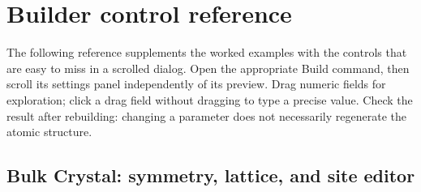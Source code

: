 \section{Builder control reference}\label{sec:builder-controls}
The following reference supplements the worked examples with the controls that are easy to miss in a scrolled dialog. Open the appropriate Build command, then scroll its settings panel independently of its preview. Drag numeric fields for exploration; click a drag field without dragging to type a precise value. Check the result after rebuilding: changing a parameter does not necessarily regenerate the atomic structure.

\subsection{Bulk Crystal: symmetry, lattice, and site editor}
